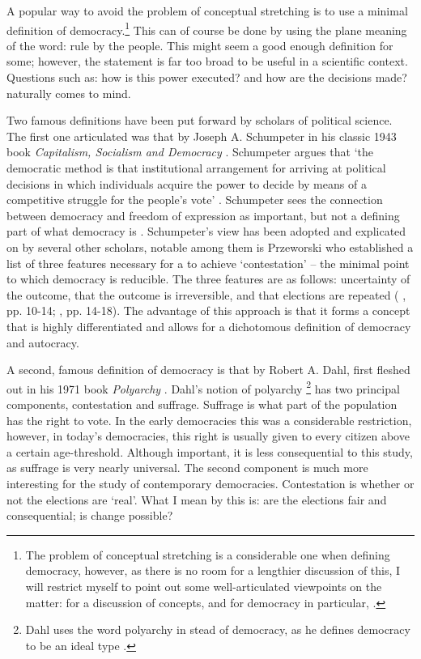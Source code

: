 A popular way to avoid the problem of conceptual stretching is to use a minimal definition of democracy.\footnote{The problem of conceptual stretching is a considerable one when defining democracy, however, as there is no room for a lengthier discussion of this, I will restrict myself to point out some well-articulated viewpoints on the matter: \citealp[see:][]{alvarez_classifying_1996, collier_conceptual_1993, sartori_concept_1970} for a discussion of concepts, and for democracy in particular, \citealp[see:][]{collier_democracy_1997}.} This can of course be done by using the plane meaning of the word: rule by the people. This might seem a good enough definition for some; however, the statement is far too broad to be useful in a scientific context. Questions such as: how is this power executed? and how are the decisions made? naturally comes to mind.

Two famous definitions have been put forward by scholars of political science. The first one articulated was that by Joseph A. Schumpeter in his classic 1943 book \textit{Capitalism, Socialism and Democracy} \citeyearpar{schumpeter_capitalism_2010}.  Schumpeter argues that `the democratic method is that institutional arrangement for arriving at political decisions in which individuals acquire the power to decide by means of a competitive struggle for the people’s vote' \citep[p. 241]{schumpeter_capitalism_2010}. Schumpeter sees the connection between democracy and freedom of expression as important, but not a defining part of what democracy is \citep[pp. 243-244]{schumpeter_capitalism_2010}. Schumpeter's view has been adopted and explicated on by several other scholars, notable among them is Przeworski who established a list of three features necessary for a to achieve `contestation' -- the minimal point to which democracy is reducible. The three features are as follows: uncertainty of the outcome, that the outcome is irreversible, and that elections are repeated (\citeauthor{przeworski_democracy_1991} \citeyear{przeworski_democracy_1991}, pp. 10-14; \citeauthor{przeworski_modernization_1997} \citeyear{przeworski_modernization_1997}, pp. 14-18). The advantage of this approach is that it forms a concept that is highly differentiated and allows for a dichotomous definition of democracy and autocracy. 

A second, famous definition of democracy is that by Robert A. Dahl, first fleshed out in his 1971 book \textit{Polyarchy} \citeyearpar{dahl_polyarchy_1971}. Dahl's notion of polyarchy \footnote{Dahl uses the word polyarchy in stead of democracy, as he defines democracy to be an ideal type \citep[p.9]{dahl_polyarchy_1971}.} has two principal components, contestation and suffrage. Suffrage is what part of the population has the right to vote. In the early democracies this was a considerable restriction, however, in today's democracies, this right is usually given to every citizen above a certain age-threshold. Although important, it is less consequential to this study, as suffrage is very nearly universal. The second component is much more interesting for the study of contemporary democracies. Contestation is whether or not the elections are `real'. What I mean by this is: are the elections fair and consequential; is change possible? 

